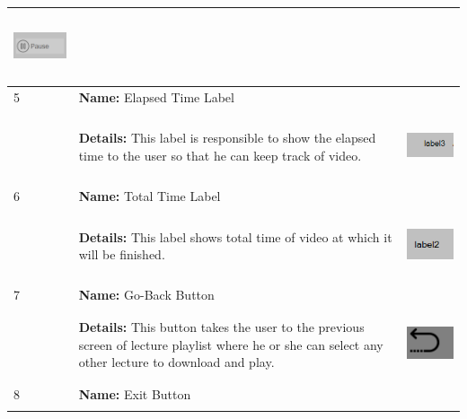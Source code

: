 \documentclass[12pt]{article}
\begin{document}
\begin{center}
\begin{longtable}{|p{2cm}|p{7cm}|p{4cm}|}
\begin{minipage}{.3\textwidth}
      \includegraphics[width=\linewidth, height=20mm]{Pause_Button}
    \end{minipage}\\
  \hline 5 &
  \textbf{Name:} Elapsed Time Label\\&
\textbf{Details:} This label is responsible to show the elapsed time to the user so that he can keep track of video.& \begin{minipage}{.3\textwidth}
      \includegraphics[width=\linewidth, height=20mm]{Elapsed_Time_Label}
    \end{minipage}\\
  \hline 6 &
  \textbf{Name:} Total Time Label\\&
\textbf{Details:}  This label shows total time of video at which it will be finished.& \begin{minipage}{.3\textwidth}
      \includegraphics[width=\linewidth, height=20mm]{Total_Time_Label}
    \end{minipage}\\
  \hline 7 &
  \textbf{Name:} Go-Back Button\\&
\textbf{Details:} This button takes the user to the previous screen of lecture playlist where he or she can select any other lecture to download and play.& \begin{minipage}{.3\textwidth}
      \includegraphics[width=\linewidth, height=20mm]{Go_Back_Button}
    \end{minipage}\\
  \hline 8 &
  \textbf{Name:} Exit Button\\&

\end{longtable}
\end{center}
\end{document}
